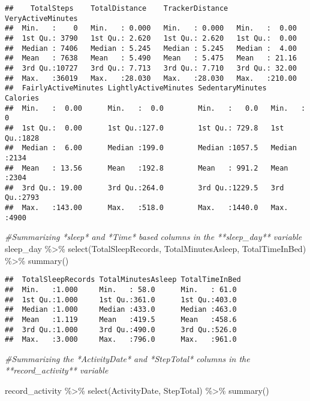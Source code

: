 \documentclass[
]{article}
\newenvironment{Shaded}{\begin{snugshade}}{\end{snugshade}}
\newcommand{\CommentTok}[1]{\textcolor[rgb]{0.56,0.35,0.01}{\textit{#1}}}
\newcommand{\FunctionTok}[1]{\textcolor[rgb]{0.00,0.00,0.00}{#1}}
\newcommand{\NormalTok}[1]{#1}
\newcommand{\SpecialCharTok}[1]{\textcolor[rgb]{0.00,0.00,0.00}{#1}}
\begin{document}
\begin{verbatim}
##    TotalSteps    TotalDistance    TrackerDistance  VeryActiveMinutes
##  Min.   :    0   Min.   : 0.000   Min.   : 0.000   Min.   :  0.00   
##  1st Qu.: 3790   1st Qu.: 2.620   1st Qu.: 2.620   1st Qu.:  0.00   
##  Median : 7406   Median : 5.245   Median : 5.245   Median :  4.00   
##  Mean   : 7638   Mean   : 5.490   Mean   : 5.475   Mean   : 21.16   
##  3rd Qu.:10727   3rd Qu.: 7.713   3rd Qu.: 7.710   3rd Qu.: 32.00   
##  Max.   :36019   Max.   :28.030   Max.   :28.030   Max.   :210.00   
##  FairlyActiveMinutes LightlyActiveMinutes SedentaryMinutes    Calories   
##  Min.   :  0.00      Min.   :  0.0        Min.   :   0.0   Min.   :   0  
##  1st Qu.:  0.00      1st Qu.:127.0        1st Qu.: 729.8   1st Qu.:1828  
##  Median :  6.00      Median :199.0        Median :1057.5   Median :2134  
##  Mean   : 13.56      Mean   :192.8        Mean   : 991.2   Mean   :2304  
##  3rd Qu.: 19.00      3rd Qu.:264.0        3rd Qu.:1229.5   3rd Qu.:2793  
##  Max.   :143.00      Max.   :518.0        Max.   :1440.0   Max.   :4900
\end{verbatim}

\begin{Shaded}
\begin{Highlighting}[]
\CommentTok{\#Summarizing *sleep* and *Time* based columns in the **sleep\_day** variable }
\NormalTok{sleep\_day }\SpecialCharTok{\%\textgreater{}\%}
  \FunctionTok{select}\NormalTok{(TotalSleepRecords, TotalMinutesAsleep, TotalTimeInBed) }\SpecialCharTok{\%\textgreater{}\%}
  \FunctionTok{summary}\NormalTok{() }
\end{Highlighting}
\end{Shaded}

\begin{verbatim}
##  TotalSleepRecords TotalMinutesAsleep TotalTimeInBed 
##  Min.   :1.000     Min.   : 58.0      Min.   : 61.0  
##  1st Qu.:1.000     1st Qu.:361.0      1st Qu.:403.0  
##  Median :1.000     Median :433.0      Median :463.0  
##  Mean   :1.119     Mean   :419.5      Mean   :458.6  
##  3rd Qu.:1.000     3rd Qu.:490.0      3rd Qu.:526.0  
##  Max.   :3.000     Max.   :796.0      Max.   :961.0
\end{verbatim}

\begin{Shaded}
\begin{Highlighting}[]
\CommentTok{\#Summarizing the *ActivityDate* and  *StepTotal* columns in the **record\_activity** variable }

\NormalTok{record\_activity }\SpecialCharTok{\%\textgreater{}\%} 
  \FunctionTok{select}\NormalTok{(ActivityDate, StepTotal) }\SpecialCharTok{\%\textgreater{}\%}
  \FunctionTok{summary}\NormalTok{()}
\end{Highlighting}
\end{Shaded}
\end{document}
